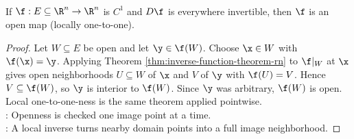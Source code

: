 \begin{corollary} \label{cor:local-diffeomorphism-open-map} \\
If $\f:E\subseteq\R^n\to\R^n$ is $C^1$ and $D\f$ is everywhere invertible, then $\f$ is an open map (locally one-to-one).
\begin{proof}
Let $W\subseteq E$ be open and let $\y\in\f(W)$. Choose $\x\in W$ with $\f(\x)=\y$. Applying Theorem \ref{thm:inverse-function-theorem-rn} to $\f|_W$ at $\x$ gives open neighborhoods $U\subseteq W$ of $\x$ and $V$ of $\y$ with $\f(U)=V$. Hence $V\subseteq\f(W)$, so $\y$ is interior to $\f(W)$. Since $\y$ was arbitrary, $\f(W)$ is open. Local one-to-one-ness is the same theorem applied pointwise.\\
: Openness is checked one image point at a time.\\
: A local inverse turns nearby domain points into a full image neighborhood.
\end{proof}
\end{corollary}

